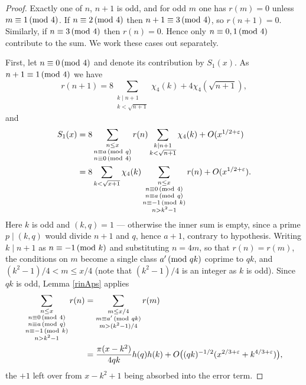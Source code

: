 \documentclass[10pt,a4paper]{amsart}
\renewcommand{\pmod}[1]{\mkern3mu(\mathrm{mod}\ #1)}
\begin{document}
\begin{proof}
    Exactly one of $n$, $n+1$ is odd, and for odd $m$ one has $r(m) = 0$ unless $m \equiv 1 \pmod 4$. If $n \equiv 2 \pmod 4$ then $n+1 \equiv 3 \pmod 4$, so $r(n+1) = 0$.
    Similarly, if $n \equiv 3 \pmod 4$ then $r(n) = 0$. 
    Hence only $n \equiv 0, 1 \pmod 4$ contribute to the sum.
    We work these cases out separately.

    First, let $n \equiv 0 \pmod 4$ and denote its contribution by $S_1(x)$. As $n + 1\equiv 1 \pmod 4$ we have
    \[
        r(n+1) = 8\sum_{\substack{k \mid n+1\\ k < \sqrt{n + 1}}}\chi_4(k) + 4\chi_4(\sqrt{n+1}),
    \]
    and
    \[
        \begin{split}
            S_1(x) &= 8 \sum_{\substack{n \le x\\ n \equiv a \pmod q \\ n \equiv 0 \pmod 4}} r(n) \sum_{\substack{k \mid n+1\\ k < \sqrt{n + 1}}}\chi_4(k) + O(x^{1/2 + \varepsilon})\\
            &= 8 \sum_{k < \sqrt{x+1}} \chi_4(k) \sum_{\substack{n \le x \\ n \equiv 0 \pmod 4\\ n \equiv a \pmod q \\ n \equiv -1 \pmod k\\ n > k^2-1}} r(n) + O(x^{1/2 + \varepsilon}).
        \end{split}
    \]
    Here $k$ is odd and $(k,q) = 1$ --- otherwise the inner sum is empty, since a prime $p \mid (k,q)$ would divide $n+1$ and $q$, hence $a+1$, contrary to hypothesis. Writing $k \mid n+1$ as $n \equiv -1 \pmod k$ and substituting $n = 4m$, so that $r(n) = r(m)$, the conditions on $m$ become a single class $a' \pmod{qk}$ coprime to $qk$, and $(k^2-1)/4 < m \le x/4$ (note that $(k^2-1)/4$ is an integer as $k$ is odd). Since $qk$ is odd, Lemma \ref{rinAps} applies
    \[
        \begin{split}
            \sum_{\substack{n \le x \\ n \equiv 0 \pmod 4\\ n \equiv a \pmod q \\
                n \equiv -1 \pmod k\\ n > k^2-1}} r(n)
            &= \sum_{\substack{m \le x/4 \\ m \equiv a' \pmod {qk} \\
                m > (k^2-1)/4}} r(m)\\
            &= \frac{\pi (x-k^2)}{4qk}h(q)h(k)
               + O\bigl((qk)^{-1/2}(x^{2/3+\varepsilon}+k^{4/3+\varepsilon})\bigr),
        \end{split}
    \]
    the $+1$ left over from $x-k^2+1$ being absorbed into the error term.
    

\end{proof}
\end{document}
